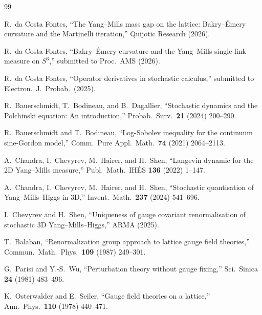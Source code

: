 \documentclass[11pt,a4paper]{article}
\theoremstyle{plain}
\theoremstyle{definition}
\theoremstyle{remark}
\begin{document}
\begin{thebibliography}{99}

 R.~da Costa Fontes, ``The Yang--Mills mass
  gap on the lattice: Bakry--\'Emery curvature and the Martinelli
  iteration,'' Quijotic Research (2026).

 R.~da Costa Fontes, ``Bakry--\'Emery
  curvature and the Yang--Mills single-link measure on $S^3$,''
  submitted to Proc.\ AMS (2026).

 R.~da Costa Fontes, ``Operator derivatives
  in stochastic calculus,'' submitted to Electron.\ J.\ Probab.\
  (2025).

 R.~Bauerschmidt, T.~Bodineau, and
  B.~Dagallier, ``Stochastic dynamics and the Polchinski equation:
  An introduction,'' Probab.\ Surv.\ \textbf{21} (2024) 200--290.

 R.~Bauerschmidt and T.~Bodineau, ``Log-Sobolev
  inequality for the continuum sine-Gordon model,'' Comm.\ Pure
  Appl.\ Math.\ \textbf{74} (2021) 2064--2113.

 A.~Chandra, I.~Chevyrev, M.~Hairer, and
  H.~Shen, ``Langevin dynamic for the 2D Yang--Mills measure,''
  Publ.\ Math.\ IH\'ES \textbf{136} (2022) 1--147.

 A.~Chandra, I.~Chevyrev, M.~Hairer, and
  H.~Shen, ``Stochastic quantisation of Yang--Mills--Higgs in 3D,''
  Invent.\ Math.\ \textbf{237} (2024) 541--696.

 I.~Chevyrev and H.~Shen, ``Uniqueness of gauge
  covariant renormalisation of stochastic 3D Yang--Mills--Higgs,''
  ARMA (2025).

 T.~Balaban, ``Renormalization group approach
  to lattice gauge field theories,'' Commun.\ Math.\ Phys.\
  \textbf{109} (1987) 249--301.

 G.~Parisi and Y.-S.~Wu, ``Perturbation theory
  without gauge fixing,'' Sci.\ Sinica \textbf{24} (1981) 483--496.

\bibitem{OS1978} K.~Osterwalder and E.~Seiler, ``Gauge field
  theories on a lattice,'' Ann.\ Phys.\ \textbf{110} (1978)
  440--471.

\end{thebibliography}
\end{document}
